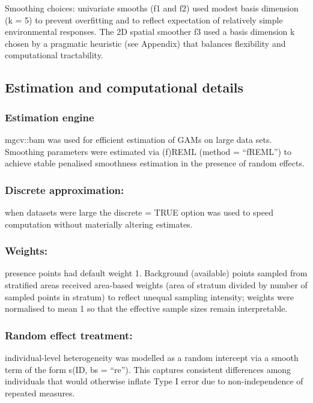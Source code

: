 \documentclass[
  letterpaper,
  DIV=11,
  numbers=noendperiod]{scrartcl}
\begin{document}
Smoothing choices: univariate smooths (f1 and f2) used modest basis
dimension (k = 5) to prevent overfitting and to reflect expectation of
relatively simple environmental responses. The 2D spatial smoother f3
used a basis dimension k chosen by a pragmatic heuristic (see Appendix)
that balances flexibility and computational tractability.

\subsection{Estimation and computational
details}\label{estimation-and-computational-details}

\subsubsection{Estimation engine}\label{estimation-engine}

mgcv::bam was used for efficient estimation of GAMs on large data sets.
Smoothing parameters were estimated via (f)REML (method = ``fREML'') to
achieve stable penalised smoothness estimation in the presence of random
effects.

\subsubsection{Discrete approximation:}\label{discrete-approximation}

when datasets were large the discrete = TRUE option was used to speed
computation without materially altering estimates.

\subsubsection{Weights:}\label{weights}

presence points had default weight 1. Background (available) points
sampled from stratified areas received area-based weights (area of
stratum divided by number of sampled points in stratum) to reflect
unequal sampling intensity; weights were normalised to mean 1 so that
the effective sample sizes remain interpretable.

\subsubsection{Random effect treatment:}\label{random-effect-treatment}

individual-level heterogeneity was modelled as a random intercept via a
smooth term of the form s(ID, bs = ``re''). This captures consistent
differences among individuals that would otherwise inflate Type I error
due to non-independence of repeated measures.
\end{document}
